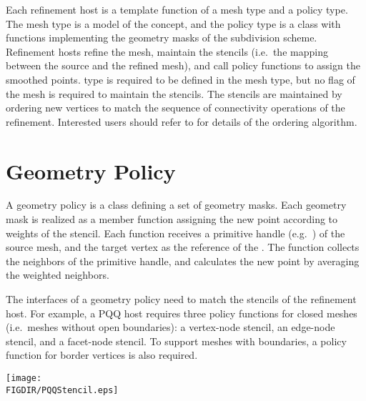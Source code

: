 
Each refinement host is a template function of
a mesh type and a policy type. The mesh type is
a model of the  concept, and the
policy type is a class with functions implementing the 
geometry masks of the subdivision scheme.
Refinement hosts refine the mesh, maintain the stencils 
(i.e.~the mapping between the source and the refined mesh), 
and call policy functions
to assign the smoothed points.  type is required
to be defined in the mesh type, but no flag of the mesh 
is required to maintain the stencils. The stencils are maintained
by ordering new vertices to match the sequence of connectivity 
operations of the refinement. Interested users should 
refer to \cite{cgal:shiue-mreo-05} for details of the 
ordering algorithm.

\section{Geometry Policy}
A geometry policy is a class defining a set of geometry masks. 
Each geometry mask is realized as a member function assigning
the new point according to weights of the stencil.
Each function receives a primitive handle 
(e.g.~) of 
the source mesh, and the target vertex as the reference of 
the . The function collects the neighbors
of the primitive handle, and calculates the new point by averaging
the weighted neighbors. 

The interfaces of a geometry policy need to match the stencils of 
the refinement host. For example, a PQQ host requires three 
policy functions for closed meshes (i.e.~meshes without open 
boundaries): a vertex-node stencil, an edge-node stencil, and a 
facet-node stencil. To support meshes with boundaries, a policy function
for border vertices is also required.

\begin{ccTexOnly}
  \begin{center}
    \parbox{0.5\textwidth}{%
      \texttt{[image: \\FIGDIR/PQQStencil.eps]}%
    }
  \end{center}
\end{ccTexOnly}

